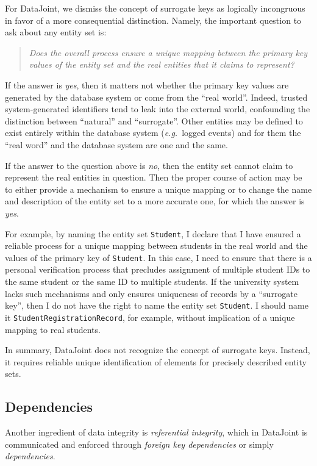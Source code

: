 \documentclass[letter,10pt]{article}
\newcommand{\datajoint}{DataJoint\xspace}
\begin{document}
For \datajoint, we dismiss the concept of surrogate keys as logically incongruous in favor of a more consequential distinction.
Namely, the important question to ask about any entity set is:
\begin{quote}
\em
Does the overall process ensure a unique mapping between the primary key values of the entity set and the real entities that it claims to represent?
\end{quote}

If the answer is \emph{yes}, then it matters not whether the primary key values are generated by the database system or come from the ``real world''. 
Indeed, trusted system-generated identifiers tend to leak into the external world, confounding the distinction between ``natural'' and ``surrogate''.
Other entities may be defined to exist entirely within the database system (\emph{e.g.}\ logged events) and for them the ``real word'' and the database system are one and the same.

If the answer to the question above is \emph{no}, then the entity set cannot claim to represent the real entities in question. 
Then the proper course of action may be to either provide a mechanism to ensure a unique mapping or to change the name and description of the entity set to a more accurate one, for which the answer is \emph{yes}. 

For example, by naming the entity set \lstinline$Student$, I declare that I have ensured a reliable process for a unique mapping between students in the real world and the values of the primary key of \lstinline$Student$.
In this case, I need to ensure that there is a personal verification process that precludes assignment of multiple student IDs to the same student or the same ID to multiple students.
If the university system lacks such mechanisms and only ensures uniqueness of records by a ``surrogate key'', then I do not have the right to name the entity set \lstinline$Student$.
I should name it \lstinline$StudentRegistrationRecord$, for example, without implication of a unique mapping to real students.

In summary, \datajoint does not recognize the concept of surrogate keys.  
Instead, it requires reliable unique identification of elements for precisely described entity sets.

\subsection{Dependencies}
Another ingredient of data integrity is \emph{referential integrity}, which in \datajoint is communicated and enforced through \emph{foreign key dependencies} or simply \emph{dependencies}.
\end{document}
